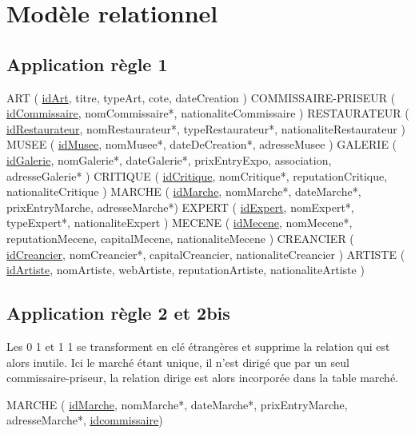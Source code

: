 \documentclass{article}
\begin{document}
\section{Modèle relationnel}
\subsection{Application règle 1}

ART ( \underline{idArt}, titre, typeArt, cote, dateCreation ) \newline
COMMISSAIRE-PRISEUR ( \underline{idCommissaire}, nomCommissaire*, nationaliteCommissaire )\newline
RESTAURATEUR ( \underline{idRestaurateur}, nomRestaurateur*, typeRestaurateur*, nationaliteRestaurateur )\newline
MUSEE ( \underline{idMusee}, nomMusee*, dateDeCreation*, adresseMusee )\newline
GALERIE ( \underline{idGalerie}, nomGalerie*, dateGalerie*, prixEntryExpo, association, adresseGalerie* )\newline
CRITIQUE ( \underline{idCritique}, nomCritique*, reputationCritique, nationaliteCritique )\newline
MARCHE ( \underline{idMarche}, nomMarche*, dateMarche*, prixEntryMarche, adresseMarche*)\newline
EXPERT ( \underline{idExpert}, nomExpert*, typeExpert*, nationaliteExpert )\newline
MECENE ( \underline{idMecene}, nomMecene*, reputationMecene, capitalMecene, nationaliteMecene )\newline
CREANCIER ( \underline{idCreancier}, nomCreancier*, capitalCreancier, nationaliteCreancier )\newline
ARTISTE ( \underline{idArtiste}, nomArtiste, webArtiste, reputationArtiste, nationaliteArtiste )\newline

\subsection{Application règle 2 et 2bis}

Les 0 1 et 1 1 se transforment en clé étrangères et supprime la relation qui est alors inutile.
Ici le marché étant unique, il n'est dirigé que par un seul commissaire-priseur, la relation dirige est alors incorporée dans la table marché.

MARCHE ( \underline{idMarche}, nomMarche*, dateMarche*, prixEntryMarche, adresseMarche*, \underline{\underline{idcommissaire}})
\end{document}
